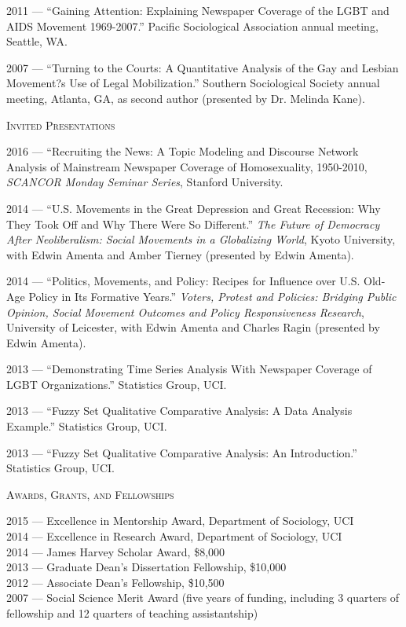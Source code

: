 \documentclass[11pt]{article}
\newcommand{\sectionheader}[1]{
{\Large
\textsc{#1}}
}
\begin{document}
2011 --- ``Gaining Attention: Explaining Newspaper Coverage of the LGBT and AIDS Movement 1969-2007.'' Pacific Sociological Association annual meeting, Seattle, WA.

2007	 --- ``Turning to the Courts: A Quantitative Analysis of the Gay and Lesbian Movement?s Use of Legal Mobilization.'' Southern Sociological Society annual meeting, Atlanta, GA, as second author (presented by Dr. Melinda Kane).

\sectionheader{Invited Presentations}

2016 --- ``Recruiting the News: A Topic Modeling and Discourse Network Analysis of Mainstream Newspaper Coverage of Homosexuality, 1950-2010, \textit{SCANCOR Monday Seminar Series}, Stanford University.

2014 --- ``U.S. Movements in the Great Depression and Great Recession: Why They Took Off and Why There Were So Different.'' \textit{The Future of Democracy After Neoliberalism: Social Movements in a Globalizing World}, Kyoto University, with Edwin Amenta and Amber Tierney (presented by Edwin Amenta). 

2014 --- ``Politics, Movements, and Policy: Recipes for Influence over U.S. Old-Age Policy in Its Formative Years.'' \textit{Voters, Protest and Policies: Bridging Public Opinion, Social Movement Outcomes and Policy Responsiveness Research}, University of Leicester, with Edwin Amenta and Charles Ragin (presented by Edwin Amenta).

2013 --- ``Demonstrating Time Series Analysis With Newspaper Coverage of LGBT Organizations.'' Statistics Group, UCI.

2013 --- ``Fuzzy Set Qualitative Comparative Analysis: A Data Analysis Example.'' Statistics Group, UCI.

2013 --- ``Fuzzy Set Qualitative Comparative Analysis: An Introduction.'' Statistics Group, UCI.



\sectionheader{Awards, Grants, and Fellowships}

2015 --- Excellence in Mentorship Award, Department of Sociology, UCI\\
2014 --- Excellence in Research Award, Department of Sociology, UCI\\
2014 --- James Harvey Scholar Award, \$8,000\\
2013 --- Graduate Dean's Dissertation Fellowship, \$10,000\\
2012 --- Associate Dean's Fellowship, \$10,500\\
2007 --- Social Science Merit Award (five years of funding, including 3 quarters of fellowship and 12 quarters of teaching assistantship)\\
\end{document}
